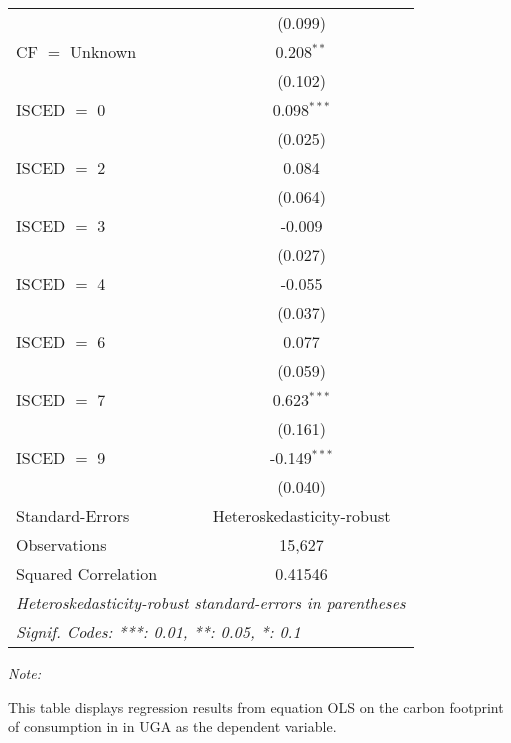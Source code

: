 \begin{table}[htbp!]
\begin{adjustbox}{width = 1\textwidth, max height = 0.95\textheight, center}
\begin{threeparttable}[b]
\begin{tabular}{lc}
                                & (0.099)\\   
            CF $=$ Unknown      & 0.208$^{**}$\\   
                                & (0.102)\\   
            ISCED $=$ 0         & 0.098$^{***}$\\   
                                & (0.025)\\   
            ISCED $=$ 2         & 0.084\\   
                                & (0.064)\\   
            ISCED $=$ 3         & -0.009\\   
                                & (0.027)\\   
            ISCED $=$ 4         & -0.055\\   
                                & (0.037)\\   
            ISCED $=$ 6         & 0.077\\   
                                & (0.059)\\   
            ISCED $=$ 7         & 0.623$^{***}$\\   
                                & (0.161)\\   
            ISCED $=$ 9         & -0.149$^{***}$\\   
                                & (0.040)\\   
            \midrule 
            Standard-Errors     & Heteroskedasticity-robust \\   
            Observations        & 15,627\\  
            Squared Correlation & 0.41546\\  
            \midrule \midrule
            \multicolumn{2}{l}{\emph{Heteroskedasticity-robust standard-errors in parentheses}}\\
            \multicolumn{2}{l}{\emph{Signif. Codes: ***: 0.01, **: 0.05, *: 0.1}}\\
         \end{tabular}
         
         \begin{tablenotes}\item \medskip \textit{Note:}
            \item This table displays regression results from equation OLS on the carbon footprint of consumption in  in UGA as the dependent variable.  
         \end{tablenotes}
      \end{threeparttable}
   \end{adjustbox}
\end{table}


